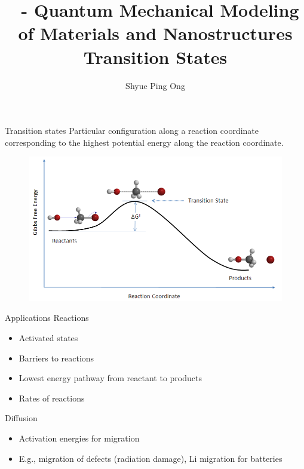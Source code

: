 \documentclass[aspectratio=169]{beamer}
\title[\classname Transition States]{\classname~- Quantum Mechanical Modeling of Materials and Nanostructures\\Transition States}
\author{Shyue Ping Ong}
\institute[UCSD]{University of California, San Diego\\
\medskip
}
\date{\classyear} %
\begin{document}
    \begin{frame}
        \titlepage %
    \end{frame}


    \begin{frame}{Transition states}
Particular configuration along a reaction coordinate corresponding to the highest potential energy along the reaction coordinate.
\begin{figure}
    \centering
    \includegraphics[width=0.5\linewidth]{lectures/figures/12_transition_state.png}
    \caption{}
\end{figure} 

    \end{frame}

\begin{frame}{Applications}
Reactions
\begin{itemize}
    \item Activated states
    \item Barriers to reactions
    \item Lowest energy pathway from reactant to products
    \item Rates of reactions
\end{itemize}

Diffusion
\begin{itemize}
    \item Activation energies for migration
    \item E.g., migration of defects (radiation damage), Li migration for batteries
\end{itemize}
\end{frame} 
\end{document}
